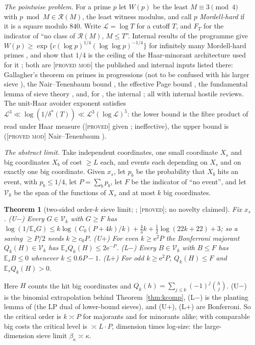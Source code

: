 \documentclass[10pt,reqno]{amsart}
\newtheorem{theorem}{Theorem}[section]
\theoremstyle{definition}
\theoremstyle{remark}
\newcommand{\cR}{\mathscr R}
\newcommand{\E}{\mathbb E}
\newcommand{\e}{\mathrm e}
\newcommand{\lab}[1]{\textup{[\textsc{#1}]}}
\begin{document}
\emph{The pointwise problem.}  For a prime $p$ let $W(p)$ be the least
$M\equiv3\pmod4$ with $p\bmod M\in\cR(M)$, the least witness modulus, and call $p$
\emph{Mordell-hard} if it is a square modulo $840$.  Write $\mathcal L=\log T$ for a
cutoff $T$, and $F_T$ for the indicator of ``no class of $\cR(M)$, $M\leq T$''.
Internal results of the programme give $W(p)\geq\exp\{c(\log p)^{1/4}(\log\log p)^{-1/4}\}$
for infinitely many Mordell-hard primes \cite[Thm~5.1]{O13}, and show
that $1/4$ is the ceiling of the Haar-minorant architecture used for it
\cite[Thm~4.5, Cor.~4.6]{O14}; both are \lab{proved mod} the published and
internal inputs listed there: Gallagher's theorem on primes in progressions
\cite[Thm~7]{GallagherPNT} (not to be confused with his larger sieve
\cite{Gallagher}), the Nair--Tenenbaum bound \cite{NairTenenbaum}, the effective
Page bound \cite[Ch.~20]{Davenport}, the fundamental lemma of sieve theory
\cite{OperaDeCribro}, and, for \cite[Thm~5.1]{O13}, the internal
\cite[Thm~3.4]{O10}; all with internal hostile reviews.  The
unit-Haar avoider exponent satisfies
$\mathcal L^3\ll\log(1/\delta^*(T))\ll\mathcal L^3(\log\mathcal L)^5$: the lower bound is the
fibre product of \cite{TQ} read under Haar measure \cite[Prop.~1.1]{CU}
(\lab{proved} given \cite{TQ}; ineffective), the upper bound is
\cite[Thm~3.4]{O13} (\lab{proved mod} Nair--Tenenbaum \cite{NairTenenbaum}).

\emph{The abstract limit.}  Take independent coordinates, one small
coordinate $X_s$ and big coordinates $X_b$ of cost $\geq L$ each, and events each
depending on $X_s$ and on exactly one big coordinate.  Given $x_s$, let $p_b$ be
the probability that $X_b$ hits an event, with $p_b\leq1/4$, let $P=\sum_bp_b$, let
$F$ be the indicator of ``no event'', and let $\mathcal V_k$ be the span of the
functions of $X_s$ and at most $k$ big coordinates.

\begin{theorem}[two-sided order-$k$ sieve limit; {\cite[Thm~4.1]{CU}}; \lab{proved}; no novelty claimed]\label{thm:twosided}
Fix $x_s$.
(U$-$) Every $G\in\mathcal V_k$ with $G\geq F$ has
$\log(1/\E_sG)\leq k\log(C_0(P+4k)/k)+\tfrac43k+\tfrac12\log(22k+22)+3$; so a saving
$\geq P/2$ needs $k\geq c_0P$.
(U$+$) For even $k\geq\e^2P$ the Bonferroni majorant $Q_k(H)\in\mathcal V_k$ has
$\E_sQ_k(H)\leq2\e^{-P}$.
(L$-$) Every $B\in\mathcal V_k$ with $B\leq F$ has $\E_sB\leq0$ whenever $k\leq0.6P-1$.
(L$+$) For odd $k\geq\e^2P$, $Q_k(H)\leq F$ and $\E_sQ_k(H)>0$.
\end{theorem}
Here $H$ counts the hit big coordinates and $Q_k(h)=\sum_{j\leq k}(-1)^j\binom hj$.
(U$-$) is the binomial extrapolation behind Theorem~\ref{thm:kcomp}, (L$-$) is
the planting lemma of \cite[Lemma~1.1, Thm~1.3]{O14} (the LP dual of
lower-bound sieves), and (U$+$), (L$+$) are Bonferroni.  So the critical
order is $k\asymp P$ for majorants and for minorants alike; with comparable big
costs the critical level is $\asymp L\cdot P$, dimension times log-size: the
large-dimension sieve limit $\beta_\kappa\asymp\kappa$.
\end{document}
